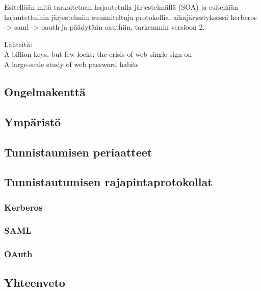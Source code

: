 Esitellään mitä tarkoitetaan hajautetulla järjestelmällä (SOA) ja esitellään hajautettuihin järjestelmiin suunniteltuja protokollia, aikajärjestyksessä  kerberos -> saml -> oauth ja päädytään oauthiin, tarkemmin versioon 2.

Lähteitä:\\
A billion keys, but few locks: the crisis of web single sign-on \cite{billion_keys}\\
A large-scale study of web password habits \cite{password_habits}


\subsection{Ongelmakenttä}

\subsection{Ympäristö}

\subsection{Tunnistaumisen periaatteet}

\subsection{Tunnistautumisen rajapintaprotokollat}

\subsubsection{Kerberos}

\subsubsection{SAML}

\subsubsection{OAuth}

\subsection{Yhteenveto}

